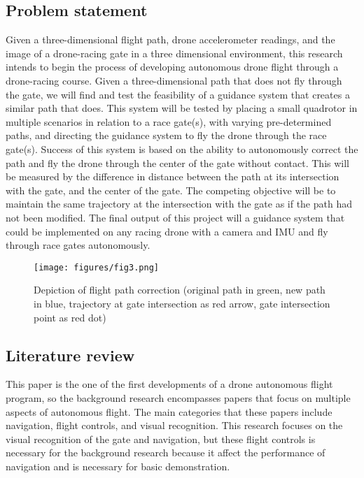 \subsection{Problem statement}
Given a three-dimensional flight path, drone accelerometer readings, and the image of a drone-racing gate in a three dimensional environment, this research intends to begin the process of developing autonomous drone flight through a drone-racing course. Given a three-dimensional path that does not fly through the gate, we will find and test the feasibility of a guidance system that creates a similar path that does. This system will be tested by placing a small quadrotor in multiple scenarios in relation to a race gate(s), with varying pre-determined paths, and directing the guidance system to fly the drone through the race gate(s). Success of this system is based on the ability to autonomously correct the path and fly the drone through the center of the gate without contact. This will be measured by the difference in distance between the path at its intersection with the gate, and the center of the gate. The competing objective will be to maintain the same trajectory at the intersection with the gate as if the path had not been modified. The final output of this project will a guidance system that could be implemented on any racing drone with a camera and IMU and fly through race gates autonomously.
\begin{figure}[t]
\begin{center}
\texttt{[image: figures/fig3.png]}
\end{center}
\caption{Depiction of flight path correction (original path in green, new path in blue, trajectory at gate intersection as red arrow, gate intersection point as red dot)}
\label{fig:3}
\end{figure}

\subsection{Literature review}
This paper is the one of the first developments of a drone autonomous flight program, so the background research encompasses papers that focus on multiple aspects of autonomous flight. The main categories that these papers include navigation, flight controls, and visual recognition. This research focuses on the visual recognition of the gate and navigation, but these flight controls is necessary for the background research because it affect the performance of navigation and is necessary for basic demonstration.

